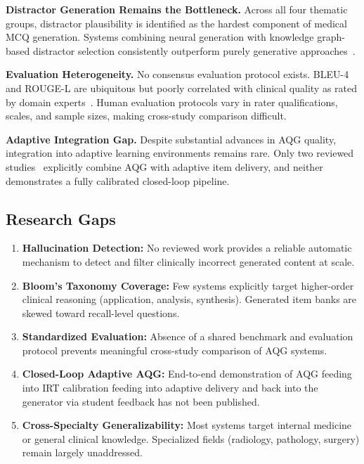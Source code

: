 \documentclass[conference]{IEEEtran}
\begin{document}
\textbf{Distractor Generation Remains the Bottleneck.} Across all four thematic groups, distractor plausibility is identified as the hardest component of medical MCQ generation. Systems combining neural generation with knowledge graph-based distractor selection consistently outperform purely generative approaches~\cite{leo2019ontology,vachev2022leaf,lotfi2024kg}.

\textbf{Evaluation Heterogeneity.} No consensus evaluation protocol exists. BLEU-4 and ROUGE-L are ubiquitous but poorly correlated with clinical quality as rated by domain experts~\cite{kurdi2020systematic}. Human evaluation protocols vary in rater qualifications, scales, and sample sizes, making cross-study comparison difficult.

\textbf{Adaptive Integration Gap.} Despite substantial advances in AQG quality, integration into adaptive learning environments remains rare. Only two reviewed studies~\cite{bulut2023adaptive,qu2021adaptive} explicitly combine AQG with adaptive item delivery, and neither demonstrates a fully calibrated closed-loop pipeline.

\subsection{Research Gaps}

\begin{enumerate}
  \item \textbf{Hallucination Detection:} No reviewed work provides a reliable automatic mechanism to detect and filter clinically incorrect generated content at scale.
  \item \textbf{Bloom's Taxonomy Coverage:} Few systems explicitly target higher-order clinical reasoning (application, analysis, synthesis). Generated item banks are skewed toward recall-level questions.
  \item \textbf{Standardized Evaluation:} Absence of a shared benchmark and evaluation protocol prevents meaningful cross-study comparison of AQG systems.
  \item \textbf{Closed-Loop Adaptive AQG:} End-to-end demonstration of AQG feeding into IRT calibration feeding into adaptive delivery and back into the generator via student feedback has not been published.
  \item \textbf{Cross-Specialty Generalizability:} Most systems target internal medicine or general clinical knowledge. Specialized fields (radiology, pathology, surgery) remain largely unaddressed.
\end{enumerate}
\end{document}
